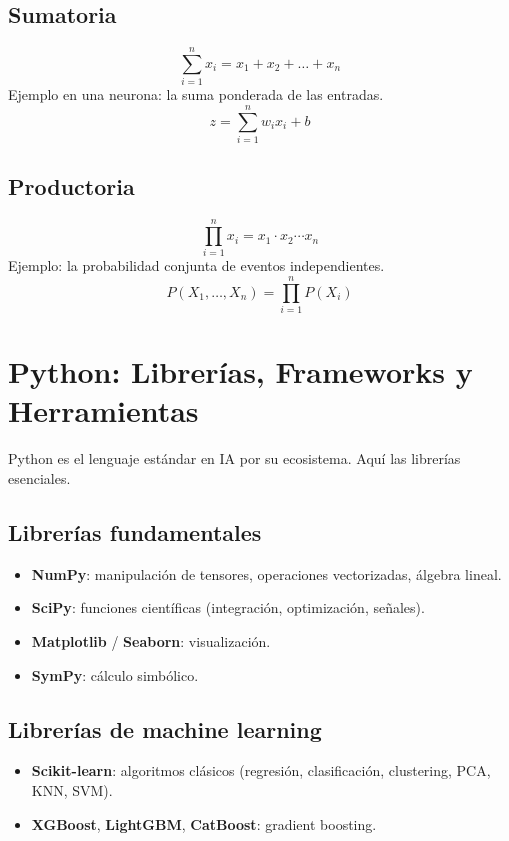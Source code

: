 \documentclass[12pt,a4paper,openany,oneside]{book}
\begin{document}
\subsection{Sumatoria}
\begin{equation*}
\sum_{i=1}^{n} x_i = x_1 + x_2 + \dots + x_n
\end{equation*}
Ejemplo en una neurona: la suma ponderada de las entradas.
\begin{equation*}
z = \sum_{i=1}^{n} w_i x_i + b
\end{equation*}

\subsection{Productoria}
\begin{equation*}
\prod_{i=1}^{n} x_i = x_1 \cdot x_2 \cdots x_n
\end{equation*}
Ejemplo: la probabilidad conjunta de eventos independientes.
\begin{equation*}
P(X_1, \dots, X_n) = \prod_{i=1}^{n} P(X_i)
\end{equation*}

\section{Python: Librerías, Frameworks y Herramientas}
Python es el lenguaje estándar en IA por su ecosistema. Aquí las librerías esenciales.

\subsection{Librerías fundamentales}
\begin{itemize}
    \item \textbf{NumPy}: manipulación de tensores, operaciones vectorizadas, álgebra lineal.
    \item \textbf{SciPy}: funciones científicas (integración, optimización, señales).
    \item \textbf{Matplotlib} / \textbf{Seaborn}: visualización.
    \item \textbf{SymPy}: cálculo simbólico.
\end{itemize}

\subsection{Librerías de machine learning}
\begin{itemize}
    \item \textbf{Scikit-learn}: algoritmos clásicos (regresión, clasificación, clustering, PCA, KNN, SVM).
    \item \textbf{XGBoost}, \textbf{LightGBM}, \textbf{CatBoost}: gradient boosting.
\end{itemize}
\end{document}
